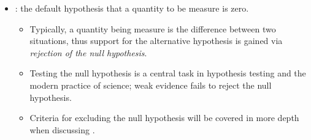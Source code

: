 \begin{itemize}
\begin{itemize}
      \item A \emph{strong hypothesis} is:
      \begin{multicols}{2}
        \begin{itemize}
          \item \emph{Falsifiable}---ideally testable, makes a criticizable prediction. 
          \item \emph{Parsimonious}---limits excessive entities; application of ``Occam's razor.''
          \item \emph{Scoped}---clear, specific, applicable; a statement, not a question.
          \item \emph{Fruitful}---may explain further phenomena, aids in understanding.
        \end{itemize}
      \end{multicols}
    \end{itemize}

  \item {}: the default hypothesis that a quantity to be measure is zero. 
    \begin{itemize}
      \item Typically, a quantity being measure is the difference between two situations, thus support for the alternative hypothesis is gained via \emph{rejection of the null hypothesis}.
      \item Testing the null hypothesis is a central task in hypothesis testing and the modern practice of science; weak evidence fails to reject the null hypothesis.
      \item Criteria for excluding the null hypothesis will be covered in more depth when discussing \hyperref[Section: Confidence Intervals]{}.
    \end{itemize}
  

\end{itemize}
